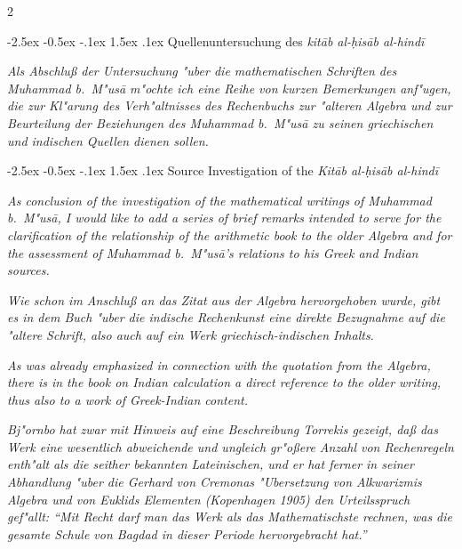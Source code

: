 \documentclass[10pt,a4paper]{article}
\makeatletter
\newcommand{\enquote}[1]{``#1''}
\renewcommand{\section}{\@startsection{section}{1}{\z@}%
  {-2.5ex \@plus -0.5ex \@minus -.1ex}%
  {1.5ex \@plus .1ex}%
  {\normalfont\large\bfseries\color{sectioncolor}}}
\makeatother
\begin{document}
\begin{paracol}{2}

\section{Quellenuntersuchung des \textit{kit\=ab al-\d{h}is\=ab al-hind\=i}}

\textit{Als Abschlu\ss{} der Untersuchung "uber die mathematischen Schriften des Muhammad b.\ M"us\=a m"ochte ich eine Reihe von kurzen Bemerkungen anf"ugen, die zur Kl"arung des Verh"altnisses des Rechenbuchs zur "alteren Algebra und zur Beurteilung der Beziehungen des Muhammad b.\ M"us\=a zu seinen griechischen und indischen Quellen dienen sollen.}

\switchcolumn

\section{Source Investigation of the \textit{Kit\=ab al-\d{h}is\=ab al-hind\=i}}

\textit{As conclusion of the investigation of the mathematical writings of Muhammad b.\ M"us\=a, I would like to add a series of brief remarks intended to serve for the clarification of the relationship of the arithmetic book to the older Algebra and for the assessment of Muhammad b.\ M"us\=a's relations to his Greek and Indian sources.}

\switchcolumn*

\textit{Wie schon im Anschlu\ss{} an das Zitat aus der \textit{Algebra} hervorgehoben wurde, gibt es in dem Buch "uber die indische Rechenkunst eine direkte Bezugnahme auf die "altere Schrift, also auch auf ein Werk griechisch-indischen Inhalts.}

\switchcolumn

\textit{As was already emphasized in connection with the quotation from the \textit{Algebra}, there is in the book on Indian calculation a direct reference to the older writing, thus also to a work of Greek-Indian content.}

\switchcolumn*

\textit{Bj"ornbo hat zwar mit Hinweis auf eine Beschreibung Torrekis gezeigt, da\ss{} das Werk eine wesentlich abweichende und ungleich gr"o\ss{}ere Anzahl von Rechenregeln enth"alt als die seither bekannten Lateinischen, und er hat ferner in seiner Abhandlung "uber die \textit{Gerhard von Cremonas "Ubersetzung von Alkwarizmis Algebra und von Euklids Elementen} (Kopenhagen 1905) den Urteilsspruch gef"allt: \enquote{Mit Recht darf man das Werk als das Mathematischste rechnen, was die gesamte \textit{Schule von Bagdad} in dieser Periode hervorgebracht hat.}}


\end{paracol}
\end{document}
